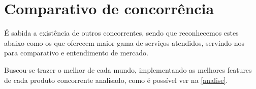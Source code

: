     \begin{comment}
    \section{Hatron}
    Ofertam a terceirização de suporte \textit{help desk}, através de atendimento e, quando necessário, enviando técnicos para o ambiente local. Atendem demandas de rede, servidores, novos projetos de TI e consultoria. Atende pessoas jurídicas.
    
    \section{Mundo Open Tecnologia}
    Oferecem atendimento personalizado, atuando nas frentes de arquitetura, otimização de ambiente, \textit{help desk} e gerenciando a infraestrutura de TI. Atende pessoas jurídicas.
    
    \section{Fóruns Microsoft}
    Plataforma com grande base de conhecimentos, para que o usuário possa buscar erros nos produtos Microsoft e consiga ver problemas similares de outros usuários já resolvidos, ou ainda, incluir seu problema e aguardar um auxílio da comunidade. Serviço gratuito.
    
    \end{comment}
    
\newpage
    \section{Comparativo de concorrência}
    É sabida a existência de outros concorrentes, sendo que reconhecemos estes abaixo como os que oferecem maior gama de serviços atendidos, servindo-nos para comparativo e entendimento de mercado.
    
    Buscou-se trazer o melhor de cada mundo, implementando as melhores features de cada produto concorrente analisado, como é possível ver na \autoref{analise}.

